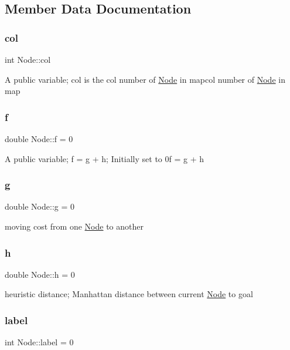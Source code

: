 \subsection{Member Data Documentation}
\mbox{\label{classNode_abdb252855cd894ac2d09b16ff1446a3a}} 
\subsubsection{\texorpdfstring{col}{col}}
{\footnotesize\ttfamily int Node\+::col}

A public variable; col is the col number of \hyperlink{classNode}{Node} in mapcol number of \hyperlink{classNode}{Node} in map \mbox{\label{classNode_aa78fc6cd04892bc631b80d023ef088c4}} 
\subsubsection{\texorpdfstring{f}{f}}
{\footnotesize\ttfamily double Node\+::f = 0}

A public variable; f = g + h; Initially set to 0f = g + h \mbox{\label{classNode_af93b606cf10abfe1766617ad9de59b01}} 
\subsubsection{\texorpdfstring{g}{g}}
{\footnotesize\ttfamily double Node\+::g = 0}

moving cost from one \hyperlink{classNode}{Node} to another \mbox{\label{classNode_ae96fc081027353fbe793c35ea511116b}} 
\subsubsection{\texorpdfstring{h}{h}}
{\footnotesize\ttfamily double Node\+::h = 0}

heuristic distance; Manhattan distance between current \hyperlink{classNode}{Node} to goal \mbox{\label{classNode_ab2c4f74231b19640104ac28fd17dae18}} 
\subsubsection{\texorpdfstring{label}{label}}
{\footnotesize\ttfamily int Node\+::label = 0}

